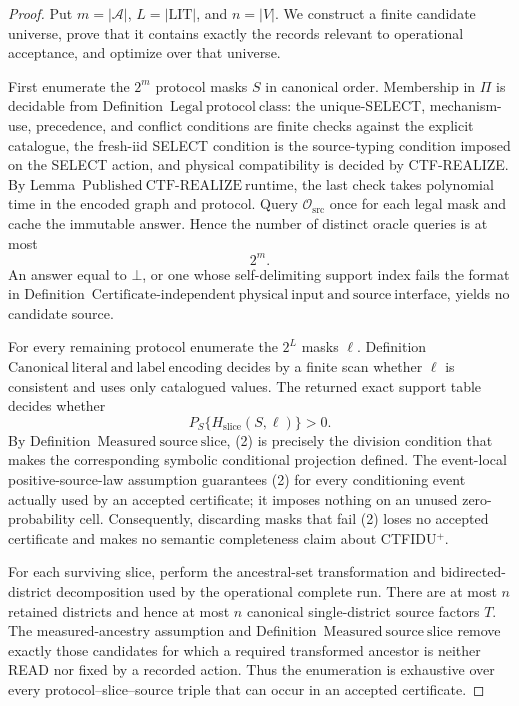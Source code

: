 \documentclass{article}
\begin{document}
\begin{proof}
Put \(m=|\mathcal A|\), \(L=|\mathrm{LIT}|\), and \(n=|V|\).  We construct a finite candidate universe, prove that it contains exactly the records relevant to operational acceptance, and optimize over that universe.

First enumerate the \(2^m\) protocol masks \(S\) in canonical order.  Membership in \(\Pi\) is decidable from Definition~\(\mathrm{Legal\ protocol\ class}\): the unique-SELECT, mechanism-use, precedence, and conflict conditions are finite checks against the explicit catalogue, the fresh-iid SELECT condition is the source-typing condition imposed on the SELECT action, and physical compatibility is decided by CTF-REALIZE.  By Lemma~\(\mathrm{Published\ CTF\text{-}REALIZE\ runtime}\), the last check takes polynomial time in the encoded graph and protocol.  Query \(\mathcal O_{\mathrm{src}}\) once for each legal mask and cache the immutable answer.  Hence the number of distinct oracle queries is at most
\[
  2^m. \tag{1}
\]
An answer equal to \(\bot\), or one whose self-delimiting support index fails the format in Definition~\(\mathrm{Certificate\text{-}independent\ physical\ input\ and\ source\ interface}\), yields no candidate source.

For every remaining protocol enumerate the \(2^L\) masks \(\ell\).  Definition~\(\mathrm{Canonical\ literal\ and\ label\ encoding}\) decides by a finite scan whether \(\ell\) is consistent and uses only catalogued values.  The returned exact support table decides whether
\[
  P_S\{H_{\mathrm{slice}}(S,\ell)\}>0. \tag{2}
\]
By Definition~\(\mathrm{Measured\ source\ slice}\), (2) is precisely the division condition that makes the corresponding symbolic conditional projection defined.  The event-local positive-source-law assumption guarantees (2) for every conditioning event actually used by an accepted certificate; it imposes nothing on an unused zero-probability cell.  Consequently, discarding masks that fail (2) loses no accepted certificate and makes no semantic completeness claim about CTFIDU\({}^{+}\).

For each surviving slice, perform the ancestral-set transformation and bidirected-district decomposition used by the operational complete run.  There are at most \(n\) retained districts and hence at most \(n\) canonical single-district source factors \(T\).  The measured-ancestry assumption and Definition~\(\mathrm{Measured\ source\ slice}\) remove exactly those candidates for which a required transformed ancestor is neither READ nor fixed by a recorded action.  Thus the enumeration is exhaustive over every protocol--slice--source triple that can occur in an accepted certificate.


\end{proof}
\end{document}
